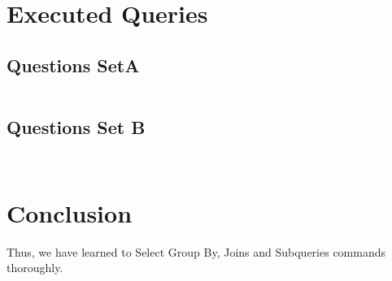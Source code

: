 \documentclass[11pt]{article}
\begin{document}
\section{Executed Queries}

\subsection{Questions SetA}

\begin{lstlisting}[language=SQL]

\end{lstlisting}

\subsection{Questions Set B}

\begin{lstlisting}[language=SQL]
	
\end{lstlisting}
\section{Conclusion}
Thus, we have learned to Select Group By, Joins and Subqueries commands thoroughly.
\clearpage
\end{document}
